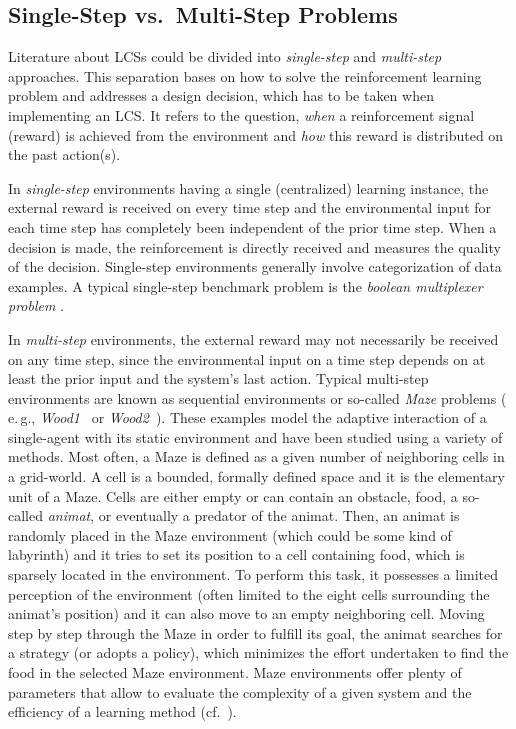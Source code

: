\subsection{Single-Step vs.\ Multi-Step Problems}
\label{subsection:single-step-vs-multi-step-problems}

Literature about LCSs could be divided into \emph{single-step} and \emph{mul\-ti-step} approaches. This separation bases on how to solve the reinforcement learning problem and addresses a design decision, which has to be taken when implementing an LCS. It refers to the question, \emph{when} a reinforcement signal (reward) is achieved from the environment and \emph{how} this reward is distributed on the past action(s). 

In \emph{single-step} environments having a single (centralized) learning instance, the external reward is received on every time step and the environmental input for each time step has completely been independent of the prior time step. %
When a decision is made, the reinforcement is directly received and measures the quality of the decision. Single-step environments generally involve categorization of data examples. A typical single-step benchmark problem is the \emph{boolean multiplexer problem} \cite{BKLW04,Wil95}. 

In \emph{multi-step} environments, the external reward may not necessarily be received on any time step, since the environmental input on a time step depends on at least the prior input and the system's last action. Typical multi-step environments are known as sequential environments or so-called \emph{Maze} problems ( e.\,g., \emph{Wood1}~\cite{Wil94} or \emph{Wood2}~\cite{Wil95}). These examples model the adaptive interaction of a single-agent with its static environment and have been studied using a variety of methods. Most often, a Maze is defined as a given number of neighboring cells in a grid-world. A cell is a bounded, formally defined space and it is the elementary unit of a Maze. Cells are either empty or can contain an obstacle, food, a so-called \emph{animat}, or eventually a predator of the animat. Then, an animat is randomly placed in the Maze environment (which could be some kind of labyrinth) and it tries to set its position to a cell containing food, which is sparsely located in the environment. To perform this task, it possesses a limited perception of the environment (often limited to the eight cells surrounding the animat's position) and it can also move to an empty neighboring cell. Moving step by step through the Maze in order to fulfill its goal, the animat searches for a strategy (or adopts a policy), which minimizes the effort undertaken to find the food in the selected Maze environment. Maze environments offer plenty of parameters that allow to evaluate the complexity of a given system and the efficiency of a learning method (cf.~\cite{BZ05}).

